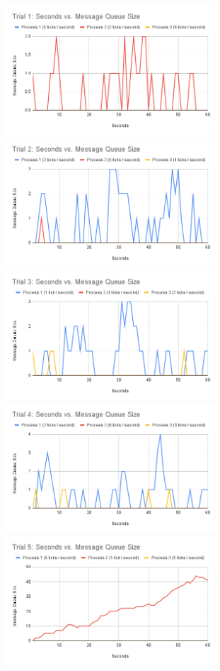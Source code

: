 \documentclass[
	a4paper, %
	10pt, %
	unnumberedsections, %
	twoside, %
]{LTJournalArticle}
\begin{document}
\includegraphics[width=7.8cm]{assets/t1_size.png}
\includegraphics[width=7.8cm]{assets/t2_size.png}
\includegraphics[width=7.8cm]{assets/t3_size.png}
\includegraphics[width=7.8cm]{assets/t4_size.png}
\includegraphics[width=7.8cm]{assets/t5_size.png}
\end{document}
